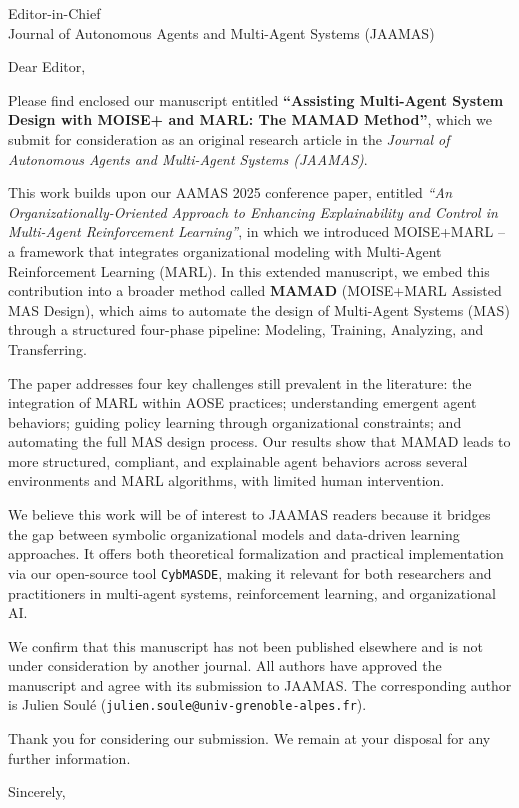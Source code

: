 \documentclass[11pt]{letter}
\begin{document}
\begin{letter}{Editor-in-Chief \\ Journal of Autonomous Agents and Multi-Agent Systems (JAAMAS)}

\opening{Dear Editor,}

Please find enclosed our manuscript entitled \textbf{“Assisting Multi-Agent System Design with MOISE+ and MARL: The MAMAD Method”}, which we submit for consideration as an original research article in the \emph{Journal of Autonomous Agents and Multi-Agent Systems (JAAMAS)}.

This work builds upon our AAMAS 2025 conference paper, entitled \textit{“An Organizationally-Oriented Approach to Enhancing Explainability and Control in Multi-Agent Reinforcement Learning”}, in which we introduced MOISE+MARL -- a framework that integrates organizational modeling with Multi-Agent Reinforcement Learning (MARL).
In this extended manuscript, we embed this contribution into a broader method called \textbf{MAMAD} (MOISE+MARL Assisted MAS Design), which aims to automate the design of Multi-Agent Systems (MAS) through a structured four-phase pipeline: Modeling, Training, Analyzing, and Transferring.

The paper addresses four key challenges still prevalent in the literature: the integration of MARL within AOSE practices; understanding emergent agent behaviors; guiding policy learning through organizational constraints; and automating the full MAS design process. Our results show that MAMAD leads to more structured, compliant, and explainable agent behaviors across several environments and MARL algorithms, with limited human intervention.

We believe this work will be of interest to JAAMAS readers because it bridges the gap between symbolic organizational models and data-driven learning approaches. It offers both theoretical formalization and practical implementation via our open-source tool \texttt{CybMASDE}, making it relevant for both researchers and practitioners in multi-agent systems, reinforcement learning, and organizational AI.

We confirm that this manuscript has not been published elsewhere and is not under consideration by another journal. All authors have approved the manuscript and agree with its submission to JAAMAS. The corresponding author is Julien Soulé (\texttt{julien.soule@univ-grenoble-alpes.fr}).

Thank you for considering our submission. We remain at your disposal for any further information.

\closing{Sincerely,}

\end{letter}
\end{document}
